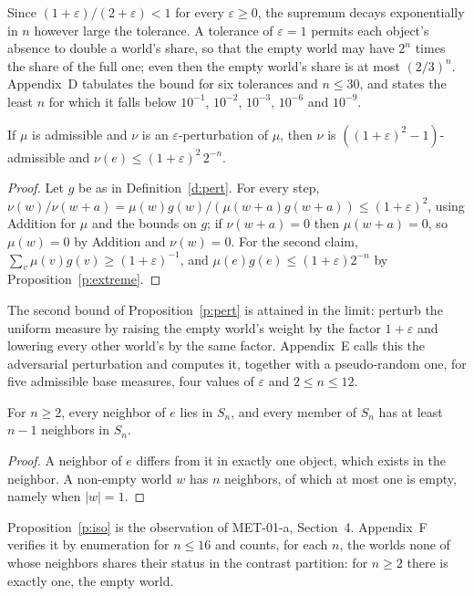 \documentclass{situationist-preprint}
\begin{document}
Since $(1+\varepsilon)/(2+\varepsilon) < 1$ for every $\varepsilon \geq 0$, the supremum decays exponentially in $n$ however large the tolerance. A tolerance of $\varepsilon = 1$ permits each object's absence to double a world's share, so that the empty world may have $2^n$ times the share of the full one; even then the empty world's share is at most $(2/3)^n$. Appendix~D tabulates the bound for six tolerances and $n \leq 30$, and states the least $n$ for which it falls below $10^{-1}$, $10^{-2}$, $10^{-3}$, $10^{-6}$ and $10^{-9}$.

\begin{proposition}[Perturbation]\label{p:pert}
If $\mu$ is admissible and $\nu$ is an $\varepsilon$-perturbation of $\mu$, then $\nu$ is $((1+\varepsilon)^2 - 1)$-admissible and $\nu(e) \leq (1+\varepsilon)^2\, 2^{-n}$.
\end{proposition}

\begin{proof}
Let $g$ be as in Definition~\ref{d:pert}. For every step, $\nu(w)/\nu(w+a) = \mu(w)g(w)/(\mu(w+a)g(w+a)) \leq (1+\varepsilon)^2$, using Addition for $\mu$ and the bounds on $g$; if $\nu(w+a) = 0$ then $\mu(w+a) = 0$, so $\mu(w) = 0$ by Addition and $\nu(w) = 0$. For the second claim, $\sum_v \mu(v)g(v) \geq (1+\varepsilon)^{-1}$, and $\mu(e)g(e) \leq (1+\varepsilon)2^{-n}$ by Proposition~\ref{p:extreme}.
\end{proof}

The second bound of Proposition~\ref{p:pert} is attained in the limit: perturb the uniform measure by raising the empty world's weight by the factor $1+\varepsilon$ and lowering every other world's by the same factor. Appendix~E calls this the adversarial perturbation and computes it, together with a pseudo-random one, for five admissible base measures, four values of $\varepsilon$ and $2 \leq n \leq 12$.

\begin{proposition}[Isolation]\label{p:iso}
For $n \geq 2$, every neighbor of $e$ lies in $S_n$, and every member of $S_n$ has at least $n - 1$ neighbors in $S_n$.
\end{proposition}

\begin{proof}
A neighbor of $e$ differs from it in exactly one object, which exists in the neighbor. A non-empty world $w$ has $n$ neighbors, of which at most one is empty, namely when $|w| = 1$.
\end{proof}

Proposition~\ref{p:iso} is the observation of MET-01-a, Section~4. Appendix~F verifies it by enumeration for $n \leq 16$ and counts, for each $n$, the worlds none of whose neighbors shares their status in the contrast partition: for $n \geq 2$ there is exactly one, the empty world.
\end{document}
